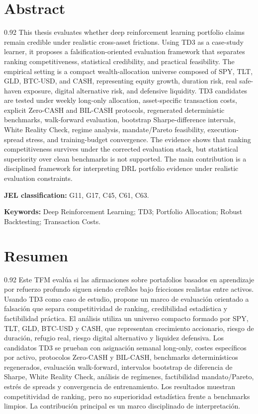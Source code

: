 \documentclass[12pt]{article}
\begin{document}
\section*{Abstract}
\begin{spacing}{0.92}
This thesis evaluates whether deep reinforcement learning portfolio claims remain credible under realistic cross-asset frictions. Using TD3 as a case-study learner, it proposes a falsification-oriented evaluation framework that separates ranking competitiveness, statistical credibility, and practical feasibility. The empirical setting is a compact wealth-allocation universe composed of SPY, TLT, GLD, BTC-USD, and CASH, representing equity growth, duration risk, real safe-haven exposure, digital alternative risk, and defensive liquidity. TD3 candidates are tested under weekly long-only allocation, asset-specific transaction costs, explicit Zero-CASH and BIL-CASH protocols, regenerated deterministic benchmarks, walk-forward evaluation, bootstrap Sharpe-difference intervals, White Reality Check, regime analysis, mandate/Pareto feasibility, execution-spread stress, and training-budget convergence. The evidence shows that ranking competitiveness survives under the corrected evaluation stack, but statistical superiority over clean benchmarks is not supported. The main contribution is a disciplined framework for interpreting DRL portfolio evidence under realistic evaluation constraints.
\end{spacing}

\textbf{JEL classification:} G11, G17, C45, C61, C63.

\textbf{Keywords:} Deep Reinforcement Learning; TD3; Portfolio Allocation; Robust Backtesting; Transaction Costs.

\section*{Resumen}
\begin{spacing}{0.92}
Este TFM evalúa si las afirmaciones sobre portafolios basados en aprendizaje por refuerzo profundo siguen siendo creíbles bajo fricciones realistas entre activos. Usando TD3 como caso de estudio, propone un marco de evaluación orientado a falsación que separa competitividad de ranking, credibilidad estadística y factibilidad práctica. El análisis utiliza un universo compacto formado por SPY, TLT, GLD, BTC-USD y CASH, que representan crecimiento accionario, riesgo de duración, refugio real, riesgo digital alternativo y liquidez defensiva. Los candidatos TD3 se prueban con asignación semanal long-only, costes específicos por activo, protocolos Zero-CASH y BIL-CASH, benchmarks determinísticos regenerados, evaluación walk-forward, intervalos bootstrap de diferencia de Sharpe, White Reality Check, análisis de regímenes, factibilidad mandato/Pareto, estrés de spreads y convergencia de entrenamiento. Los resultados muestran competitividad de ranking, pero no superioridad estadística frente a benchmarks limpios. La contribución principal es un marco disciplinado de interpretación.
\end{spacing}
\end{document}

